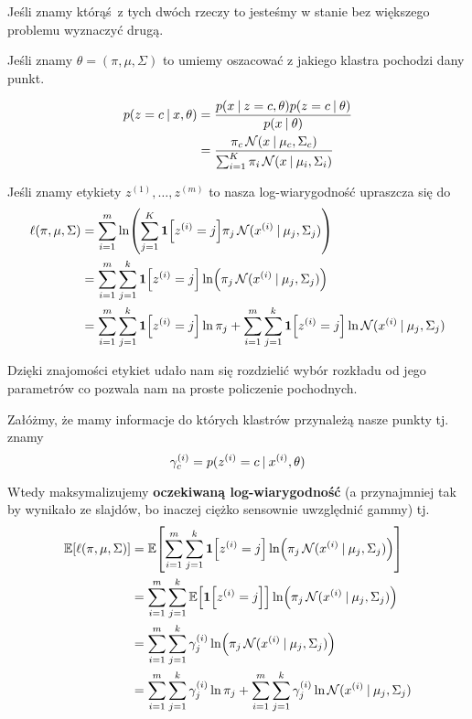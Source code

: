 Jeśli znamy którąś z tych dwóch rzeczy to jesteśmy w stanie bez większego problemu wyznaczyć drugą.

Jeśli znamy \( \theta = (\pi, \mu, \Sigma) \) to umiemy oszacować z jakiego klastra pochodzi dany punkt.

\begin{align*}
	p(z = c \:\vert\: x, \theta)
	 & = \frac{p(x \:\vert\: z = c, \theta)p(z = c \:\vert\: \theta)}{p(x \:\vert\: \theta)} \\
	 & = \frac{\pi_c\operatorname{\mathcal{N}}(x \:\vert\: \mu_c, \Sigma_c)}{
		\sum_{i=1}^K \pi_i \operatorname{\mathcal{N}}(x \:\vert\: \mu_i, \Sigma_i)
	}
\end{align*}

Jeśli znamy etykiety \( z^{(1)}, \dots, z^{(m)} \) to nasza log-wiarygodność upraszcza się do
\begin{align*}
	\ell(\pi, \mu, \Sigma)
	 & = \sum_{i=1}^m \ln \pars{\sum_{j=1}^K \indicator{z^{(i)} = j}
		\pi_j\Normal(x^{(i)} \given \mu_j, \Sigma_j)
	}                                                                                                             \\
	 & = \sum_{i=1}^m \sum_{j=1}^k \indicator{z^{(i)} = j} \ln\pars{\pi_j\Normal(x^{(i)} \given \mu_j, \Sigma_j)} \\
	 & = \sum_{i=1}^m \sum_{j=1}^k \indicator{z^{(i)} = j} \ln \pi_j
	+
	\sum_{i=1}^m \sum_{j=1}^k \indicator{z^{(i)} = j}
	\ln \Normal(x^{(i)} \given \mu_j, \Sigma_j)
\end{align*}

Dzięki znajomości etykiet udało nam się rozdzielić wybór rozkładu od jego parametrów co pozwala nam na proste policzenie pochodnych.


Załóżmy, że mamy informacje do których klastrów przynależą nasze punkty tj. znamy
\[
	\gamma^{(i)}_c = p(z^{(i)} = c \:\vert\: x^{(i)}, \theta)
\]

Wtedy maksymalizujemy \textbf{oczekiwaną log-wiarygodność} (a przynajmniej tak by wynikało ze slajdów, bo inaczej ciężko sensownie uwzględnić gammy) tj.
\begin{align*}
	\expected{\ell(\pi, \mu, \Sigma)}
	 & = \expected{\sum_{i=1}^m \sum_{j=1}^k \indicator{z^{(i)} = j} \ln\pars{\pi_j\Normal(x^{(i)} \given \mu_j, \Sigma_j)}} \\
	 & = \sum_{i=1}^m \sum_{j=1}^k \expected{\indicator{z^{(i)} = j}} \ln\pars{\pi_j\Normal(x^{(i)} \given \mu_j, \Sigma_j)} \\
	 & = \sum_{i=1}^m \sum_{j=1}^k \gamma^{(i)}_j \ln\pars{\pi_j\Normal(x^{(i)} \given \mu_j, \Sigma_j)}                     \\
	 & = \sum_{i=1}^m \sum_{j=1}^k \gamma^{(i)}_j \ln \pi_j
	+
	\sum_{i=1}^m \sum_{j=1}^k \gamma^{(i)}_j
	\ln \Normal(x^{(i)} \given \mu_j, \Sigma_j)
\end{align*}

